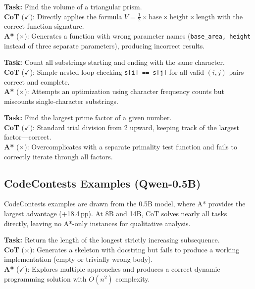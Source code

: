 \documentclass[11pt]{article}
\begin{document}
{{\begin{examplebox}[title=MBPP/14 --- CoT Correct{,} A* Wrong]
\textbf{Task:} Find the volume of a triangular prism.\\[4pt]
\textbf{CoT} ($\checkmark$): Directly applies the formula $V = \frac{1}{2} \times \text{base} \times \text{height} \times \text{length}$ with the correct function signature.\\[4pt]
\textbf{A*} ($\times$): Generates a function with wrong parameter names (\texttt{base\_area, height} instead of three separate parameters), producing incorrect results.
\end{examplebox}

\begin{examplebox}[title=MBPP/30 --- CoT Correct{,} A* Wrong]
\textbf{Task:} Count all substrings starting and ending with the same character.\\[4pt]
\textbf{CoT} ($\checkmark$): Simple nested loop checking \texttt{s[i] == s[j]} for all valid $(i,j)$ pairs---correct and complete.\\[4pt]
\textbf{A*} ($\times$): Attempts an optimization using character frequency counts but miscounts single-character substrings.
\end{examplebox}

\begin{examplebox}[title=MBPP/32 --- CoT Correct{,} A* Wrong]
\textbf{Task:} Find the largest prime factor of a given number.\\[4pt]
\textbf{CoT} ($\checkmark$): Standard trial division from 2 upward, keeping track of the largest factor---correct.\\[4pt]
\textbf{A*} ($\times$): Overcomplicates with a separate primality test function and fails to correctly iterate through all factors.
\end{examplebox}

\subsection{CodeContests Examples (Qwen-0.5B)}

CodeContests examples are drawn from the 0.5B model, where A* provides the largest advantage (+18.4\,pp). At 8B and 14B, CoT solves nearly all tasks directly, leaving no A*-only instances for qualitative analysis.

\begin{examplebox}[title=CC/0 --- A* Correct{,} CoT Wrong (0.5B)]
\textbf{Task:} Return the length of the longest strictly increasing subsequence.\\[4pt]
\textbf{CoT} ($\times$): Generates a skeleton with docstring but fails to produce a working implementation (empty or trivially wrong body).\\[4pt]
\textbf{A*} ($\checkmark$): Explores multiple approaches and produces a correct dynamic programming solution with $O(n^2)$ complexity.
\end{examplebox}

}}
\end{document}
